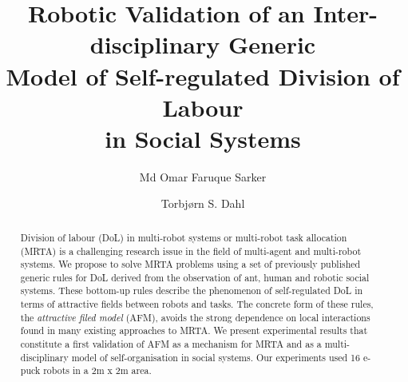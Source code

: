 \documentclass{llncs}
\begin{document}
\title{Robotic Validation of an Inter-disciplinary Generic\\
Model of Self-regulated Division of Labour\\ in Social Systems
}
\author{Md Omar Faruque Sarker \and
Torbj{\o}rn S. Dahl %
}
\maketitle
\begin{abstract}
Division of labour (DoL) in multi-robot systems or multi-robot task allocation (MRTA) is a challenging research issue in the field of multi-agent and multi-robot systems.
We propose to solve MRTA problems using a set of previously published generic rules for DoL derived from the observation of ant, human and robotic social systems.
These bottom-up rules describe the phenomenon of self-regulated DoL in terms of attractive fields between robots and tasks.
The concrete form of these rules, the \textit{attractive filed model} (AFM), avoids the strong dependence on local interactions found in many existing approaches to MRTA.
We present experimental results that constitute a first validation of AFM as a mechanism for MRTA and as a multi-disciplinary model of self-organisation in social systems.
Our experiments used 16 e-puck robots in a 2m x 2m area.
\end{abstract}
\end{document}
